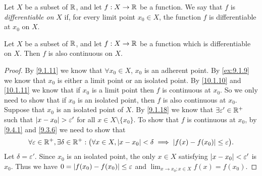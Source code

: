\begin{defn}\label{10.1.11}
  Let \(X\) be a subset of \(\mathbb{R}\), and let \(f : X \to \mathbb{R}\) be a function.
  We say that \(f\) is \emph{differentiable on} \(X\) if, for every limit point \(x_0 \in X\), the function \(f\) is differentiable at \(x_0\) on \(X\).
\end{defn}

\begin{cor}\label{10.1.12}
  Let \(X\) be a subset of \(\mathbb{R}\), and let \(f : X \to \mathbb{R}\) be a function which is differentiable on \(X\).
  Then \(f\) is also continuous on \(X\).
\end{cor}

\begin{proof}
  By \cref{9.1.11} we know that \(\forall x_0 \in X\), \(x_0\) is an adherent point.
  By \cref{ex:9.1.9} we know that \(x_0\) is either a limit point or an isolated point.
  By \cref{10.1.10} and \cref{10.1.11} we know that if \(x_0\) is a limit point then \(f\) is continuous at \(x_0\).
  So we only need to show that if \(x_0\) is an isolated point, then \(f\) is also continuous at \(x_0\).
  Suppose that \(x_0\) is an isolated point of \(X\).
  By \cref{9.1.18} we know that \(\exists \varepsilon' \in \mathbb{R}^+\) such that \(\left\lvert x - x_0\right\rvert > \varepsilon'\) for all \(x \in X \setminus \{x_0\}\).
  To show that \(f\) is continuous at \(x_0\), by \cref{9.4.1} and \cref{9.3.6} we need to show that
  \[
    \forall \varepsilon \in \mathbb{R}^+, \exists \delta \in \mathbb{R}^+ : \big(\forall x \in X, \left\lvert x - x_0\right\rvert < \delta \implies \left\lvert f(x) - f(x_0)\right\rvert \leq \varepsilon\big).
  \]
  Let \(\delta = \varepsilon'\).
  Since \(x_0\) is an isolated point, the only \(x \in X\) satisfying \(\left\lvert x - x_0\right\rvert < \varepsilon'\) is \(x_0\).
  Thus we have \(0 = \left\lvert f(x_0) - f(x_0)\right\rvert \leq \varepsilon\) and \(\lim_{x \to x_0 ; x \in X} f(x) = f(x_0)\).
\end{proof}

